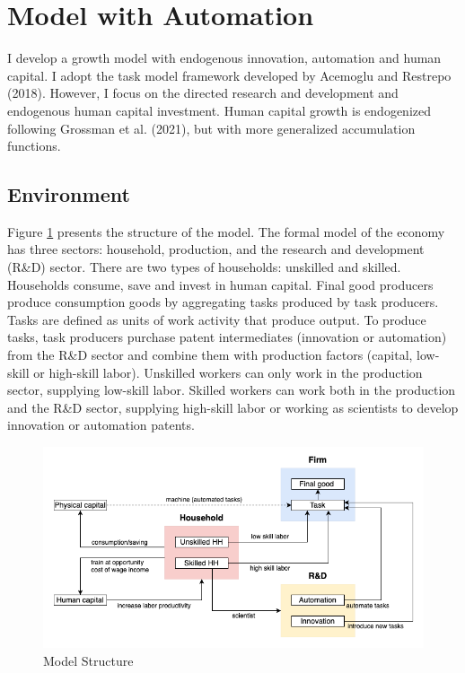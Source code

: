 \documentclass[12pt]{article}
\begin{document}
\section{Model with Automation}
I develop a growth model with endogenous innovation, automation and human capital. I adopt the task model framework developed by Acemoglu and Restrepo (2018)\nocite{AcemogluRestrepo2018}. However, I focus on the directed research and development and endogenous human capital investment. Human capital growth is endogenized following Grossman et al. (2021)\nocite{Grossmanetal2021}, but with more generalized accumulation functions. 

\subsection{Environment}
Figure \ref{model} presents the structure of the model. The formal model of the economy has three sectors: household, production, and the research and development (R\&D) sector. There are two types of households: unskilled and skilled. Households consume, save and invest in human capital. Final good producers produce consumption goods by aggregating tasks produced by task producers. Tasks are defined as units of work activity that produce output. To produce tasks, task producers purchase patent intermediates (innovation or automation) from the R\&D sector and combine them with production factors (capital, low-skill or high-skill labor). Unskilled workers can only work in the production sector, supplying low-skill labor. Skilled workers can work both in the production and the R\&D sector, supplying high-skill labor or working as scientists to develop innovation or automation patents. 

\begin{figure}[h!]
\includegraphics[width = \textwidth]{Model}
\caption{Model Structure}
\label{model}
\end{figure}
\end{document}
